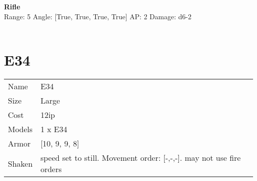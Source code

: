 \ \\

\ \\
{\bf Rifle } \\



Range: 5  Angle: [True, True, True, True] AP: 2 Damage: d6-2 \\




 
\ \\













\clearpage

\section{ E34 }

\begin{tabular}{ll}
  Name & E34 \\
  Size & Large\\
  Cost & 12ip\\
  Models & 1 x E34\\
  Armor & [10, 9, 9, 8]\\
  Shaken & speed set to still. Movement order: [-,-,-]. may not use fire orders\\
\end{tabular}

\noindent 

